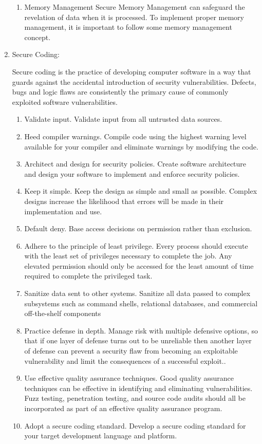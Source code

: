 \documentclass{article}
\begin{document}
\begin{enumerate}
\begin{enumerate}
        \item Memory Management \newline
        Secure Memory Management can safeguard the revelation of data when it is processed. To implement proper memory management, it is important to follow some memory management concept. 
    \end{enumerate}
    \item Secure Coding:
    
     Secure coding is the practice of developing computer software in a way that guards against the accidental introduction of security vulnerabilities. Defects, bugs and logic flaws are consistently the primary cause of commonly exploited software vulnerabilities.
\begin{enumerate}
    \item Validate input. Validate input from all untrusted data sources. 
    \item	Heed compiler warnings. Compile code using the highest warning level available for your compiler and eliminate warnings by modifying the code.
    \item	 Architect and design for security policies. Create software architecture and design your software to implement and enforce security policies. 
    \item	Keep it simple. Keep the design as simple and small as possible. Complex designs increase the likelihood that errors will be made in their implementation and use.
    \item	Default deny. Base access decisions on permission rather than exclusion. 
    \item	Adhere to the principle of least privilege. Every process should execute with the least set of privileges necessary to complete the job. Any elevated permission should only be accessed for the least amount of time required to complete the privileged task.
    \item	Sanitize data sent to other systems. Sanitize all data passed to complex subsystems such as command shells, relational databases, and commercial off-the-shelf components
    \item	Practice defense in depth. Manage risk with multiple defensive options, so that if one layer of defense turns out to be unreliable then another layer of defense can prevent a security flaw from becoming an exploitable vulnerability and limit the consequences of a successful exploit..
    \item	Use effective quality assurance techniques. Good quality assurance techniques can be effective in identifying and eliminating vulnerabilities. Fuzz testing, penetration testing, and source code audits should all be incorporated as part of an effective quality assurance program. 
    \item	Adopt a secure coding standard. Develop a secure coding standard for your target development language and platform.
\end{enumerate}	


\end{enumerate}
\end{document}
